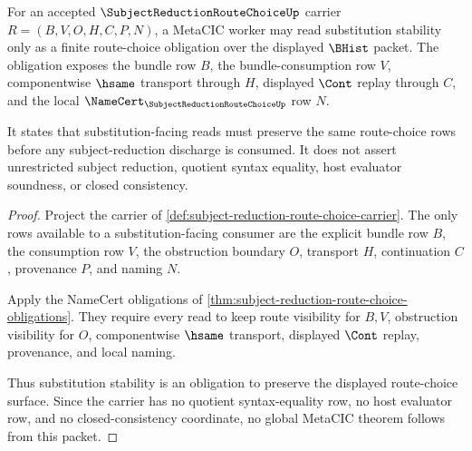 \begin{theorem}
\label{thm:subject-reduction-route-choice-substitution-stability}
For an accepted $\SubjectReductionRouteChoiceUp$ carrier $R=(B,V,O,H,C,P,N)$, a MetaCIC worker may read substitution stability only as a finite route-choice obligation over the displayed $\BHist$ packet. The obligation exposes the bundle row $B$, the bundle-consumption row $V$, componentwise $\hsame$ transport through $H$, displayed $\Cont$ replay through $C$, and the local $\NameCert_{\SubjectReductionRouteChoiceUp}$ row $N$.

It states that substitution-facing reads must preserve the same route-choice rows before any subject-reduction discharge is consumed. It does not assert unrestricted subject reduction, quotient syntax equality, host evaluator soundness, or closed consistency.
\end{theorem}
\begin{proof}
Project the carrier of \autoref{def:subject-reduction-route-choice-carrier}. The only rows available to a substitution-facing consumer are the explicit bundle row $B$, the consumption row $V$, the obstruction boundary $O$, transport $H$, continuation $C$, provenance $P$, and naming $N$.

Apply the NameCert obligations of \autoref{thm:subject-reduction-route-choice-obligations}. They require every read to keep route visibility for $B,V$, obstruction visibility for $O$, componentwise $\hsame$ transport, displayed $\Cont$ replay, provenance, and local naming.

Thus substitution stability is an obligation to preserve the displayed route-choice surface. Since the carrier has no quotient syntax-equality row, no host evaluator row, and no closed-consistency coordinate, no global MetaCIC theorem follows from this packet.
\end{proof}

